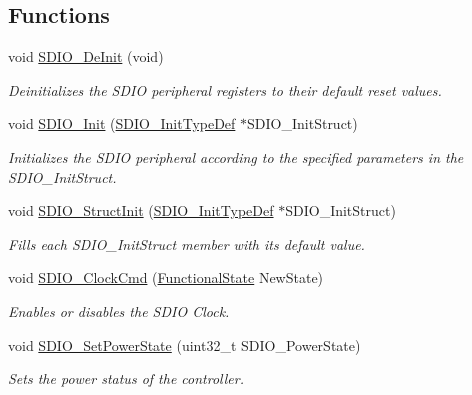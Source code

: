 \subsection*{Functions}
\begin{DoxyCompactItemize}
\item 
void \hyperlink{group___s_d_i_o___private___functions_gac359d2c6c67a2590f8f9b720c0e4ff1b}{S\+D\+I\+O\+\_\+\+De\+Init} (void)
\begin{DoxyCompactList}\small\item\em Deinitializes the S\+D\+IO peripheral registers to their default reset values. \end{DoxyCompactList}\item 
void \hyperlink{group___s_d_i_o___private___functions_gad40764a8e37c0ed5c9141ae338ff0203}{S\+D\+I\+O\+\_\+\+Init} (\hyperlink{struct_s_d_i_o___init_type_def}{S\+D\+I\+O\+\_\+\+Init\+Type\+Def} $\ast$S\+D\+I\+O\+\_\+\+Init\+Struct)
\begin{DoxyCompactList}\small\item\em Initializes the S\+D\+IO peripheral according to the specified parameters in the S\+D\+I\+O\+\_\+\+Init\+Struct. \end{DoxyCompactList}\item 
void \hyperlink{group___s_d_i_o___private___functions_ga778d338c29df4fae9ef69432e6df32ad}{S\+D\+I\+O\+\_\+\+Struct\+Init} (\hyperlink{struct_s_d_i_o___init_type_def}{S\+D\+I\+O\+\_\+\+Init\+Type\+Def} $\ast$S\+D\+I\+O\+\_\+\+Init\+Struct)
\begin{DoxyCompactList}\small\item\em Fills each S\+D\+I\+O\+\_\+\+Init\+Struct member with its default value. \end{DoxyCompactList}\item 
void \hyperlink{group___s_d_i_o___private___functions_ga7243b857d6b323748ff3a493b265bedc}{S\+D\+I\+O\+\_\+\+Clock\+Cmd} (\hyperlink{group___exported__types_gac9a7e9a35d2513ec15c3b537aaa4fba1}{Functional\+State} New\+State)
\begin{DoxyCompactList}\small\item\em Enables or disables the S\+D\+IO Clock. \end{DoxyCompactList}\item 
void \hyperlink{group___s_d_i_o___private___functions_ga36ecca32b904de74218fbe65cd5f5270}{S\+D\+I\+O\+\_\+\+Set\+Power\+State} (uint32\+\_\+t S\+D\+I\+O\+\_\+\+Power\+State)
\begin{DoxyCompactList}\small\item\em Sets the power status of the controller. \end{DoxyCompactList}\item 

\end{DoxyCompactItemize}
